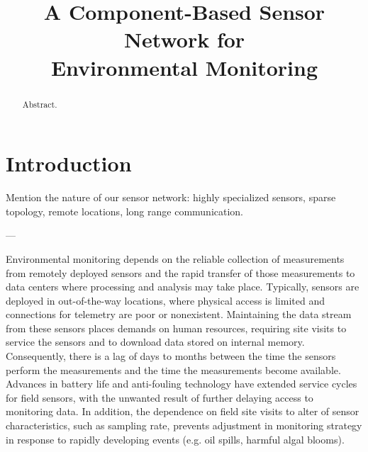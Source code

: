 \documentclass[conference]{IEEEtran}
\begin{document}
\title{A Component-Based Sensor Network for \\ Environmental Monitoring}

\author{
\and
{}
}


\maketitle
\begin{abstract}
  Abstract.
\end{abstract}


\section{Introduction}

Mention the nature of our sensor network: highly specialized sensors,
sparse topology, remote locations, long range communication.
\cite{roemer:2004}

---

Environmental monitoring depends on the reliable collection of
measurements from remotely deployed sensors and the rapid transfer of
those measurements to data centers where processing and analysis may
take place. Typically, sensors are deployed in out-of-the-way
locations, where physical access is limited and connections for
telemetry are poor or nonexistent. Maintaining the data stream from
these sensors places demands on human resources, requiring site visits
to service the sensors and to download data stored on internal memory.
Consequently, there is a lag of days to months between the time the
sensors perform the measurements and the time the measurements become
available. Advances in battery life and anti-fouling technology have
extended service cycles for field sensors, with the unwanted result of
further delaying access to monitoring data.  In addition, the
dependence on field site visits to alter of sensor characteristics, 
such as sampling rate, prevents adjustment in monitoring strategy in
response to rapidly developing events (e.g. oil spills, harmful algal
blooms).
\end{document}

